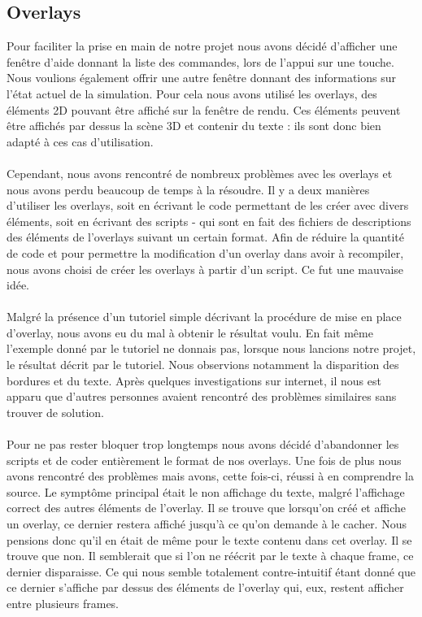 
\subsection{Overlays}
Pour faciliter la prise en main de notre projet nous avons décidé d'afficher
une fenêtre d'aide donnant la liste des commandes, lors de l'appui sur une
touche. Nous voulions également offrir une autre fenêtre donnant des
informations sur l'état actuel de la simulation.
Pour cela nous avons utilisé les overlays, des éléments 2D pouvant être
affiché sur la fenêtre de rendu. Ces éléments peuvent être affichés par dessus
la scène 3D et contenir du texte : ils sont donc bien adapté à ces cas
d'utilisation.

\paragraph{}
Cependant, nous avons rencontré de nombreux problèmes avec les overlays et
nous avons perdu beaucoup de temps à la résoudre. Il y a deux manières
d'utiliser les overlays, soit en écrivant le code permettant de les créer avec
divers éléments, soit en écrivant des scripts - qui sont en fait des fichiers
de descriptions des éléments de l'overlays suivant un certain format.
Afin de réduire la quantité de code et pour permettre la modification d'un
overlay dans avoir à recompiler, nous avons choisi de créer les overlays à
partir d'un script. Ce fut une mauvaise idée.

\paragraph{}
Malgré la présence d'un tutoriel simple décrivant la procédure de mise en
place d'overlay, nous avons eu du mal à obtenir le résultat voulu. En fait
même l'exemple donné par le tutoriel ne donnais pas, lorsque nous lancions
notre projet, le résultat décrit par le tutoriel. Nous observions notamment la
disparition des bordures et du texte. Après quelques investigations sur
internet, il nous est apparu que d'autres personnes avaient rencontré des
problèmes similaires sans trouver de solution.

\paragraph{}
Pour ne pas rester bloquer trop longtemps nous avons décidé d'abandonner les
scripts et de coder entièrement le format de nos overlays. Une fois de plus
nous avons rencontré des problèmes mais avons, cette fois-ci, réussi à en
comprendre la source. Le symptôme principal était le non affichage du texte,
malgré l'affichage correct des autres éléments de l'overlay. Il se trouve que
lorsqu'on créé et affiche un overlay, ce dernier restera affiché jusqu'à ce
qu'on demande à le cacher. Nous pensions donc qu'il en était de même pour le
texte contenu dans cet overlay. Il se trouve que non. Il semblerait que si
l'on ne réécrit par le texte à chaque frame, ce dernier disparaisse. Ce qui
nous semble totalement contre-intuitif étant donné que ce dernier s'affiche
par dessus des éléments de l'overlay qui, eux, restent afficher entre
plusieurs frames.

